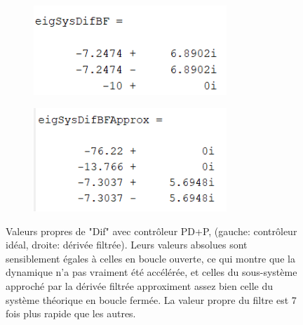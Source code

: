\documentclass{report}
\begin{document}
\begin{figure}[h]  %
    \begin{subfigure}{.5\textwidth}
        \centering
        \includegraphics[width=0.8\textwidth]{figures/eigSysDifBF.png}        
      \end{subfigure}    
      \begin{subfigure}{.5\textwidth}
        \centering
        \includegraphics[width=0.8\textwidth]{figures/eigSysDifBFApprox2.png}
      \end{subfigure}    
      \caption{Valeurs propres de "Dif" avec contrôleur PD+P, 
      (gauche: contrôleur idéal, droite: dérivée filtrée).
      Leurs valeurs absolues sont sensiblement égales à celles en boucle ouverte, 
      ce qui montre que la dynamique n'a pas vraiment été accélérée, et celles du sous-système
      approché par la dérivée filtrée approximent assez bien celle du système
      théorique en boucle fermée. 
      La valeur propre du filtre est 7 fois plus rapide que les autres.}
\end{figure}
\end{document}
